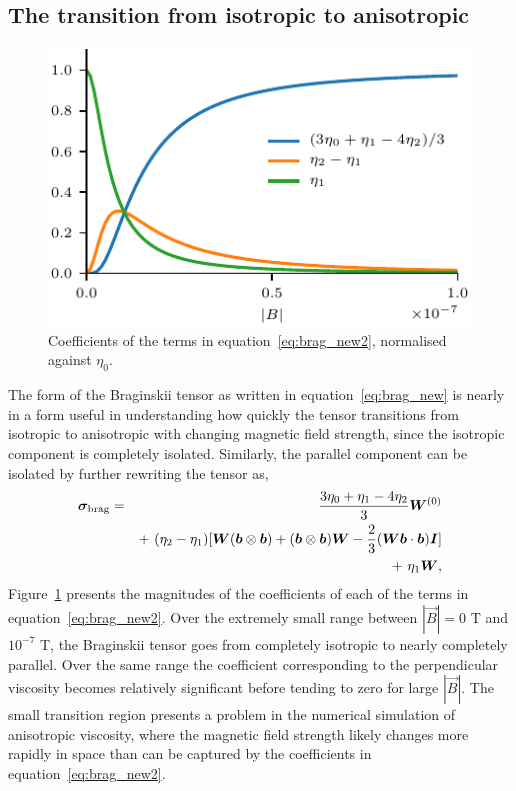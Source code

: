 \subsection{The transition from isotropic to anisotropic}

\begin{figure}[t]
  \centering
  \includegraphics[width=0.5\linewidth]{brag_coeffs_2.pdf}
  \caption{Coefficients of the terms in equation~\ref{eq:brag_new2}, normalised against $\eta_0$.}%
  \label{fig:brag_coeffs2}
\end{figure}

The form of the Braginskii tensor as written in equation~\ref{eq:brag_new} is nearly in a form useful in understanding how quickly the tensor transitions from isotropic to anisotropic with changing magnetic field strength, since the isotropic component is completely isolated. Similarly, the parallel component can be isolated by further rewriting the tensor as,
\begin{eqnarray}\label{eq:brag_new2}
\ten{\sigma}_{\rm brag} = &&\frac{3\eta_0+\eta_1-4\eta_2}{3}\ten{W}^{(0)}\\%
\nonumber
& &+~ (\eta_2-\eta_1)[\ten{W}(\vec{b}\otimes\vec{b})+(\vec{b}\otimes\vec{b})\ten{W} - \frac{2}{3}(\ten{W}\vec{b}\cdot\vec{b})\ten{I}] \\%
\nonumber
& &+~ \eta_1\ten{W},%
\end{eqnarray}
Figure~\ref{fig:brag_coeffs2} presents the magnitudes of the coefficients of each of the terms in equation~\ref{eq:brag_new2}. Over the extremely small range between $|\vec{B}| = 0$ T and $10^{-7}$ T, the Braginskii tensor goes from completely isotropic to nearly completely parallel. Over the same range the coefficient corresponding to the perpendicular viscosity becomes relatively significant before tending to zero for large $|\vec{B}|$. The small transition region presents a problem in the numerical simulation of anisotropic viscosity, where the magnetic field strength likely changes more rapidly in space than can be captured by the coefficients in equation~\ref{eq:brag_new2}.

